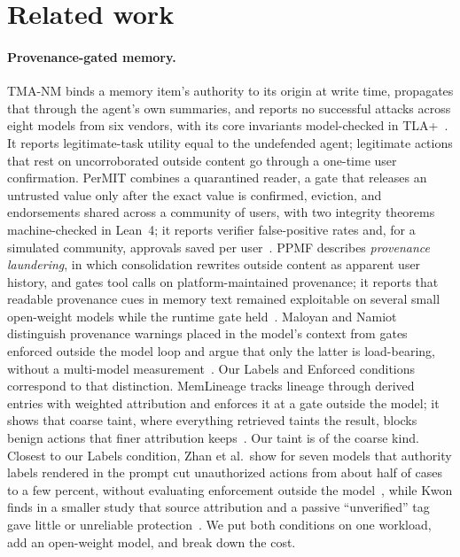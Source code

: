 \documentclass[10pt]{article}
\begin{document}
\section{Related work}
\label{sec:related}

\paragraph{Provenance-gated memory.} TMA-NM binds a memory item's authority to its origin at write
time, propagates that through the agent's own summaries, and reports no successful attacks across
eight models from six vendors, with its core invariants model-checked in TLA+~\cite{tmanm}. It
reports legitimate-task utility equal to the undefended agent; legitimate actions that rest on
uncorroborated outside content go through a one-time user confirmation. PerMIT combines a
quarantined reader, a gate that releases an untrusted value only after the exact value is
confirmed, eviction, and endorsements shared across a community of users, with two integrity
theorems machine-checked in Lean~4; it reports verifier false-positive rates and, for a simulated
community, approvals saved per user~\cite{permit}. PPMF describes \emph{provenance laundering}, in which
consolidation rewrites outside content as apparent user history, and gates tool calls on
platform-maintained provenance; it reports that readable provenance cues in memory text remained
exploitable on several small open-weight models while the runtime gate held~\cite{ppmf}. Maloyan
and Namiot distinguish provenance warnings placed in the model's context from gates enforced
outside the model loop and argue that only the latter is load-bearing, without a multi-model
measurement~\cite{sleeperchannels}. Our Labels and Enforced conditions correspond to that
distinction. MemLineage tracks lineage through derived entries with weighted attribution and
enforces it at a gate outside the model; it shows that coarse taint, where everything retrieved
taints the result, blocks benign actions that finer attribution keeps~\cite{memlineage}. Our
taint is of the coarse kind. Closest to our Labels condition, Zhan et al.\ show for seven
models that authority labels rendered in the prompt cut unauthorized actions from about half of
cases to a few percent, without evaluating enforcement outside the model~\cite{authoritycollapse},
while Kwon finds in a smaller study that source attribution and a passive ``unverified'' tag gave
little or unreliable protection~\cite{manufacturedconfidence}. We put both conditions on one
workload, add an open-weight model, and break down the cost.
\end{document}
